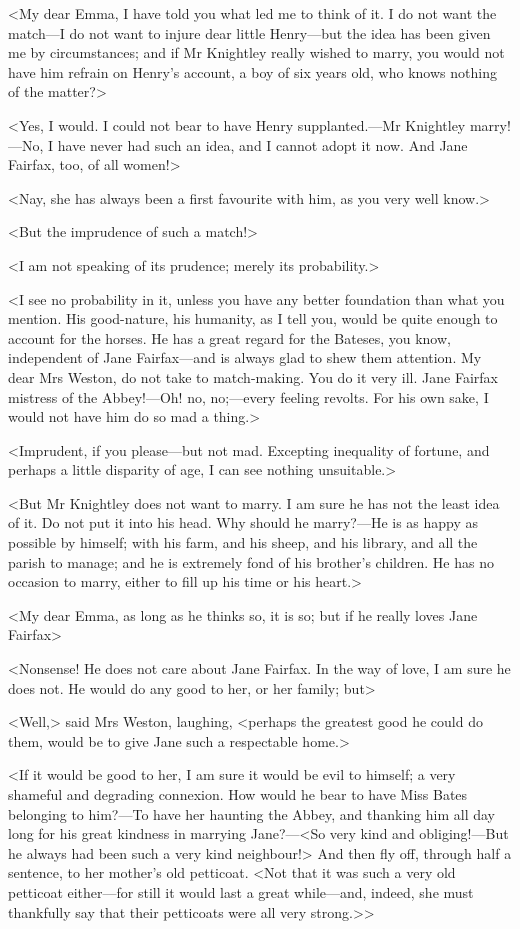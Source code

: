 <My dear Emma, I have told you what led me to think of it. I do not want the match—I do not want to injure dear little Henry—but the idea has been given me by circumstances; and if Mr Knightley really wished to marry, you would not have him refrain on Henry's account, a boy of six years old, who knows nothing of the matter?>

<Yes, I would. I could not bear to have Henry supplanted.—Mr Knightley marry!—No, I have never had such an idea, and I cannot adopt it now. And Jane Fairfax, too, of all women!>

<Nay, she has always been a first favourite with him, as you very well know.>

<But the imprudence of such a match!>

<I am not speaking of its prudence; merely its probability.>

<I see no probability in it, unless you have any better foundation than what you mention. His good-nature, his humanity, as I tell you, would be quite enough to account for the horses. He has a great regard for the Bateses, you know, independent of Jane Fairfax—and is always glad to shew them attention. My dear Mrs Weston, do not take to match-making. You do it very ill. Jane Fairfax mistress of the Abbey!—Oh! no, no;—every feeling revolts. For his own sake, I would not have him do so mad a thing.>

<Imprudent, if you please—but not mad. Excepting inequality of fortune, and perhaps a little disparity of age, I can see nothing unsuitable.>

<But Mr Knightley does not want to marry. I am sure he has not the least idea of it. Do not put it into his head. Why should he marry?—He is as happy as possible by himself; with his farm, and his sheep, and his library, and all the parish to manage; and he is extremely fond of his brother's children. He has no occasion to marry, either to fill up his time or his heart.>

<My dear Emma, as long as he thinks so, it is so; but if he really loves Jane Fairfax\longdash>

<Nonsense! He does not care about Jane Fairfax. In the way of love, I am sure he does not. He would do any good to her, or her family; but\longdash>

<Well,> said Mrs Weston, laughing, <perhaps the greatest good he could do them, would be to give Jane such a respectable home.>

<If it would be good to her, I am sure it would be evil to himself; a very shameful and degrading connexion. How would he bear to have Miss Bates belonging to him?—To have her haunting the Abbey, and thanking him all day long for his great kindness in marrying Jane?—<So very kind and obliging!—But he always had been such a very kind neighbour!> And then fly off, through half a sentence, to her mother's old petticoat. <Not that it was such a very old petticoat either—for still it would last a great while—and, indeed, she must thankfully say that their petticoats were all very strong.>>

